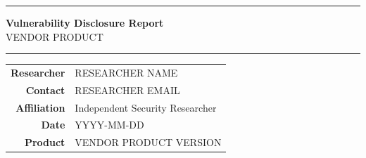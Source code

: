 \documentclass[11pt,a4paper]{article}
\newcommand{\ph}[1]{\lbrack#1\rbrack}
\begin{document}

\thispagestyle{empty}
\vspace*{0.20\textheight}

%
%
%

\noindent\rule{\linewidth}{0.6pt}

\begin{center}
{\large\bfseries Vulnerability Disclosure Report}\\[0.3em]
{\normalsize \ph{VENDOR} \ph{PRODUCT}}
\end{center}

\noindent\rule{\linewidth}{0.6pt}

\vspace{0.10\textheight}

\noindent
\begin{tabular}{r @{\quad} l}
\textbf{Researcher}  & \ph{RESEARCHER NAME} \\
\textbf{Contact}     & \ph{RESEARCHER EMAIL} \\
\textbf{Affiliation} & Independent Security Researcher \\
\textbf{Date}        & \ph{YYYY-MM-DD} \\
\textbf{Product}     & \ph{VENDOR} \ph{PRODUCT} \ph{VERSION} \\
\end{tabular}

\newpage

\tableofcontents
\end{document}
